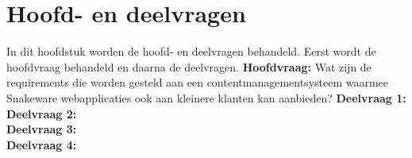 \section{Hoofd- en deelvragen}
In dit hoofdstuk worden de hoofd- en deelvragen behandeld.
Eerst wordt de hoofdvraag behandeld en daarna de deelvragen.
\whitespace
\textbf{Hoofdvraag:} Wat zijn de requirements die worden gesteld aan een contentmanagementsysteem waarmee
Snakeware webapplicaties ook aan kleinere klanten kan aanbieden?
\whitespace
\textbf{Deelvraag 1:} \SubquestionOne   \\
\textbf{Deelvraag 2:} \SubquestionTwo   \\
\textbf{Deelvraag 3:} \SubquestionThree \\
\textbf{Deelvraag 4:} \SubquestionFour  \\
